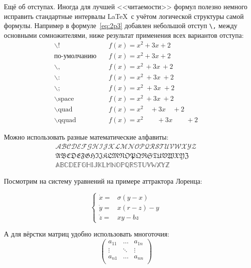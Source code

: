 Ещё об отступах. Иногда для лучшей <<читаемости>> формул полезно
немного исправить стандартные интервалы \LaTeX\ с учётом логической
структуры самой формулы. Например в формуле~\cref{eq:2p3} добавлен
небольшой отступ \verb+\,+ между основными сомножителями, ниже
результат применения всех вариантов отступа:
\begin{align*}
    \backslash!             & \quad f(x) = x^2\! +3x\! +2         \\
    \mbox{по-умолчанию}     & \quad f(x) = x^2+3x+2               \\
    \backslash,             & \quad f(x) = x^2\, +3x\, +2         \\
    \backslash{:}           & \quad f(x) = x^2\: +3x\: +2         \\
    \backslash;             & \quad f(x) = x^2\; +3x\; +2         \\
    \backslash \mbox{space} & \quad f(x) = x^2\ +3x\ +2           \\
    \backslash \mbox{quad}  & \quad f(x) = x^2\quad +3x\quad +2   \\
    \backslash \mbox{qquad} & \quad f(x) = x^2\qquad +3x\qquad +2
\end{align*}

Можно использовать разные математические алфавиты:
\begin{align}
    \mathcal{ABCDEFGHIJKLMNOPQRSTUVWXYZ} \nonumber  \\
    \mathfrak{ABCDEFGHIJKLMNOPQRSTUVWXYZ} \nonumber \\
    \mathbb{ABCDEFGHIJKLMNOPQRSTUVWXYZ} \nonumber
\end{align}

Посмотрим на систему уравнений на примере аттрактора Лоренца:

\[
\left\{
\begin{array}{rl}
    \dot x = & \sigma (y-x)  \\
    \dot y = & x (r - z) - y \\
    \dot z = & xy - bz
\end{array}
\right.
\]

А для вёрстки матриц удобно использовать многоточия:
\[
    \left(
        \begin{array}{ccc}
            a_{11} & \ldots & a_{1n} \\
            \vdots & \ddots & \vdots \\
            a_{n1} & \ldots & a_{nn} \\
        \end{array}
    \right)
\]

